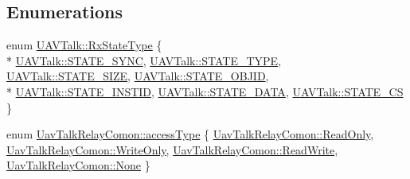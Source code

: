 \subsection*{Enumerations}
\begin{DoxyCompactItemize}
\item 
enum \hyperlink{group___u_a_v_talk_plugin_ga7f7ca2a64b0ea5ec26fb64d06bf9e09b}{U\-A\-V\-Talk\-::\-Rx\-State\-Type} \{ \\*
\hyperlink{group___u_a_v_talk_plugin_gga7f7ca2a64b0ea5ec26fb64d06bf9e09baf774a734f7889e634d5b363fa3f3c793}{U\-A\-V\-Talk\-::\-S\-T\-A\-T\-E\-\_\-\-S\-Y\-N\-C}, 
\hyperlink{group___u_a_v_talk_plugin_gga7f7ca2a64b0ea5ec26fb64d06bf9e09baa1450012a1828440751fcb6f17ac250f}{U\-A\-V\-Talk\-::\-S\-T\-A\-T\-E\-\_\-\-T\-Y\-P\-E}, 
\hyperlink{group___u_a_v_talk_plugin_gga7f7ca2a64b0ea5ec26fb64d06bf9e09ba3257c8699631219b720e0661955ef1f6}{U\-A\-V\-Talk\-::\-S\-T\-A\-T\-E\-\_\-\-S\-I\-Z\-E}, 
\hyperlink{group___u_a_v_talk_plugin_gga7f7ca2a64b0ea5ec26fb64d06bf9e09ba14ae245b4bee65b20ff1be4e31396df4}{U\-A\-V\-Talk\-::\-S\-T\-A\-T\-E\-\_\-\-O\-B\-J\-I\-D}, 
\\*
\hyperlink{group___u_a_v_talk_plugin_gga7f7ca2a64b0ea5ec26fb64d06bf9e09baadc60771fcd506f0b9714cdb478ecb08}{U\-A\-V\-Talk\-::\-S\-T\-A\-T\-E\-\_\-\-I\-N\-S\-T\-I\-D}, 
\hyperlink{group___u_a_v_talk_plugin_gga7f7ca2a64b0ea5ec26fb64d06bf9e09ba38e65dcea6f1e7c9e74726f3e2f0654b}{U\-A\-V\-Talk\-::\-S\-T\-A\-T\-E\-\_\-\-D\-A\-T\-A}, 
\hyperlink{group___u_a_v_talk_plugin_gga7f7ca2a64b0ea5ec26fb64d06bf9e09baed576d42fef7f3e2488c61b3f64402d7}{U\-A\-V\-Talk\-::\-S\-T\-A\-T\-E\-\_\-\-C\-S}
 \}
\item 
enum \hyperlink{group___u_a_v_talk_plugin_gae73e1677650d617d825cf2224fa0626a}{Uav\-Talk\-Relay\-Comon\-::access\-Type} \{ \hyperlink{group___u_a_v_talk_plugin_ggae73e1677650d617d825cf2224fa0626aa957fb229d0cc0c660145b9e1287ad8e1}{Uav\-Talk\-Relay\-Comon\-::\-Read\-Only}, 
\hyperlink{group___u_a_v_talk_plugin_ggae73e1677650d617d825cf2224fa0626aa024baabb3a664e953e20d4022ce393fa}{Uav\-Talk\-Relay\-Comon\-::\-Write\-Only}, 
\hyperlink{group___u_a_v_talk_plugin_ggae73e1677650d617d825cf2224fa0626aacc91949972bbaf73f88f2e814994481e}{Uav\-Talk\-Relay\-Comon\-::\-Read\-Write}, 
\hyperlink{group___u_a_v_talk_plugin_ggae73e1677650d617d825cf2224fa0626aa83e6c2ba48be7947d0d526ba645c6ee4}{Uav\-Talk\-Relay\-Comon\-::\-None}
 \}
\end{DoxyCompactItemize}
